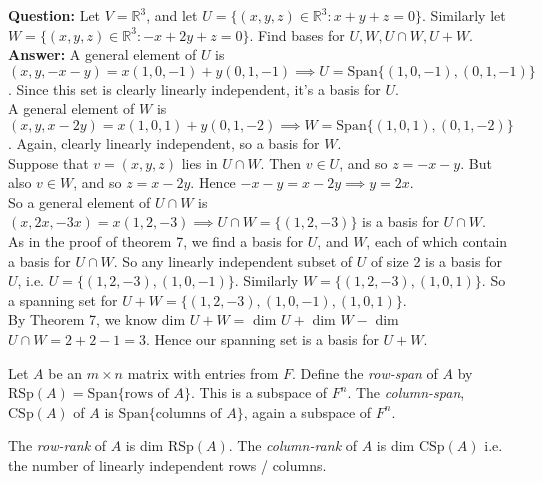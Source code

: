 \begin{example} \textbf{Question:}  
 Let $V = \mathbb{R}^3$, and let $U= \{(x,y,z) \in \mathbb{R}^3: x + y + z = 0\}.$ Similarly let $W = \{(x,y,z) \in \mathbb{R}^3: -x + 2y + z = 0\}.$ Find bases for $U, W, U \cap W, U + W$. \\

\textbf{Answer:} A general element of $U$ is $(x,y,-x-y) = x(1,0,-1) + y(0,1,-1) \implies U = \text{Span}\{(1,0,-1),(0,1,-1)\}$. Since this set is clearly linearly independent, it's a basis for $U$.\\

A general element of $W$ is $(x,y,x-2y) = x(1,0,1) + y(0,1,-2) \implies W = \text{Span}\{(1,0,1),(0,1,-2)\}$. Again, clearly linearly independent, so a basis for $W$.\\

Suppose that $v = (x,y,z)$ lies in $U \cap W$. Then $v \in U$, and so $z = -x-y$. But also $v \in W$, and so $z = x - 2y$. Hence $-x-y = x-2y \implies y = 2x$.\\

So a general element of $U \cap W$ is $(x,2x,-3x) = x(1,2,-3) \implies U\cap W = \{(1,2,-3)\} $ is a basis for $U\cap W$.\\


As in the proof of theorem 7, we find a basis for $U$, and $W$, each of which contain a basis for $U \cap W$. So any linearly independent subset of $U$ of size 2 is a basis for $U$, i.e. $U = \{(1,2,-3),(1,0,-1)\}$. Similarly $W = \{(1,2,-3),(1,0,1)\} $. So a spanning set for $U + W = \{(1,2,-3),(1,0,-1),(1,0,1)\}$.\\

By Theorem 7, we know dim $U+W = $ dim $U + $ dim $W - $ dim $U\cap W = 2 + 2 -1 = 3.$ Hence our spanning set is a basis for $U + W$.
\end{example}


\begin{definition}Let $A$ be an $m \times n$ matrix with entries from $F$. Define the \emph{row-span} of $A$ by $\text{RSp}(A) = \text{Span}\{\text{rows of }A\}$. This is a subspace of $F^n$. The \emph{column-span}, $\text{CSp}(A)$ of $A$ is  $\text{Span}\{\text{columns of }A\}$, again a subspace of $F^n$.	

The \emph{row-rank} of $A$ is dim $\text{RSp}(A)$. The \emph{column-rank} of $A$ is dim $\text{CSp}(A)$ i.e. the number of linearly independent rows / columns.
\end{definition}


